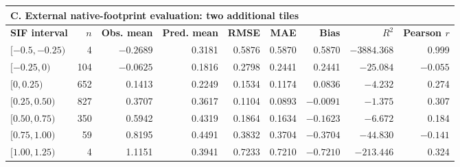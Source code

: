 \begin{table}[p]
{\begin{tabular}{lrrrrrrrr}
\multicolumn{9}{l}{\textbf{C. External native-footprint evaluation: two additional tiles}} \\
\hline
\textbf{SIF interval} & \textbf{$n$} & \textbf{Obs. mean} & \textbf{Pred. mean} & \textbf{RMSE} & \textbf{MAE} & \textbf{Bias} & \textbf{$R^2$} & \textbf{Pearson $r$} \\
\hline
$[-0.5,-0.25)$ & 4   & $-0.2689$ & 0.3181 & 0.5876 & 0.5870 & 0.5870 & $-3884.368$ & 0.999 \\
$[-0.25,0)$       & 104 & $-0.0625$ & 0.1816 & 0.2798 & 0.2441 & 0.2441 & $-25.084$ & $-0.055$ \\
$[0,0.25)$        & 652 & 0.1413 & 0.2249 & 0.1534 & 0.1174 & 0.0836 & $-4.232$ & 0.274 \\
$[0.25,0.50)$     & 827 & 0.3707 & 0.3617 & 0.1104 & 0.0893 & $-0.0091$ & $-1.375$ & 0.307 \\
$[0.50,0.75)$     & 350 & 0.5942 & 0.4319 & 0.1864 & 0.1634 & $-0.1623$ & $-6.672$ & 0.184 \\
$[0.75,1.00)$     & 59  & 0.8195 & 0.4491 & 0.3832 & 0.3704 & $-0.3704$ & $-44.830$ & $-0.141$ \\
$[1.00,1.25)$     & 4   & 1.1151 & 0.3941 & 0.7233 & 0.7210 & $-0.7210$ & $-213.446$ & 0.324 \\
\hline
\end{tabular}%
}

\vspace{0.3em}
\end{table}

